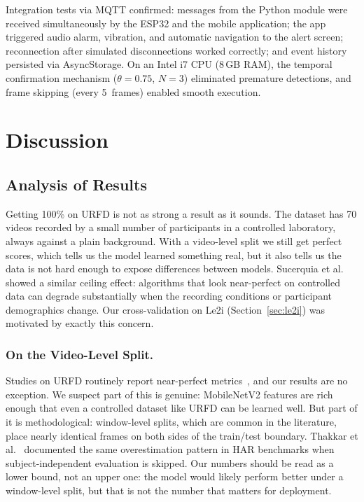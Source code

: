 \documentclass[runningheads]{llncs}
\begin{document}
Integration tests via MQTT confirmed: messages from the Python module were received simultaneously by the ESP32 and the mobile application; the app triggered audio alarm, vibration, and automatic navigation to the alert screen; reconnection after simulated disconnections worked correctly; and event history persisted via AsyncStorage. On an Intel i7 CPU (8\,GB RAM), the temporal confirmation mechanism ($\theta=0.75$, $N=3$) eliminated premature detections, and frame skipping (every 5~frames) enabled smooth execution.

\section{Discussion}

\subsection{Analysis of Results}

Getting 100\% on URFD is not as strong a result as it sounds. The dataset has 70 videos recorded by a small number of participants in a controlled laboratory, always against a plain background. With a video-level split we still get perfect scores, which tells us the model learned something real, but it also tells us the data is not hard enough to expose differences between models. Sucerquia et al.~\cite{sisfall2017} showed a similar ceiling effect: algorithms that look near-perfect on controlled data can degrade substantially when the recording conditions or participant demographics change. Our cross-validation on Le2i (Section~\ref{sec:le2i}) was motivated by exactly this concern.

\subsubsection{On the Video-Level Split.}
Studies on URFD routinely report near-perfect metrics~\cite{lu2019,chhetri2021,alanazi2022}, and our results are no exception. We suspect part of this is genuine: MobileNetV2 features are rich enough that even a controlled dataset like URFD can be learned well. But part of it is methodological: window-level splits, which are common in the literature, place nearly identical frames on both sides of the train/test boundary. Thakkar et al.~\cite{thakkar2024} documented the same overestimation pattern in HAR benchmarks when subject-independent evaluation is skipped. Our numbers should be read as a lower bound, not an upper one: the model would likely perform better under a window-level split, but that is not the number that matters for deployment.
\end{document}
